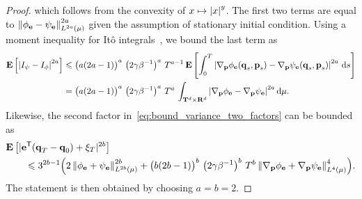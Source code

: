 \documentclass[11pt,a4paper]{article}
\newcommand{\expect}[0]{\mathbf{E}}
\newcommand{\real}{\mathbf R}
\newcommand{\torus}{\mathbf T}
\newcommand{\grad}{\nabla}
\newcommand{\vect}[1]{\boldsymbol{\mathbf #1}}
\renewcommand{\d}{\mathrm d}
\renewcommand{\t}{\mathsf T}
\theoremstyle{plain}
\numberwithin{equation}{section}
\renewcommand{\leq}{\leqslant}
\begin{document}
\begin{proof}
    which follows from the convexity of $x \mapsto \abs{x}^y$.
    The first two terms are equal to $\norm{\phi_{\vect e} - \psi_{\vect e}}_{L^{2 a}(\mu)}^{2 a}$
    given the assumption of stationary initial condition.
    Using a moment inequality for It\^o integrals~\cite[Theorem 7.1]{MR2380366},
    we bound the last term as
    \begin{align*}
        \expect \left[ \abs{I_{\psi} - I_{\phi}}^{2 a} \right]
        &\leq \bigl( a(2 a - 1)\bigr)^a \, \left(2 \gamma \beta^{-1}\right)^a \,  T^{a-1} \,
        \expect \left[ \int_{0}^{T} \abs{\grad_{\vect p} \phi_{\vect e}(\vect q_s, \vect p_s) - \grad_{\vect p} \psi_{\vect e}(\vect q_s, \vect p_s)}^{2a} \, \d s\right] \\
        &= \bigl(a(2a - 1)\bigr)^a \, \left(2 \gamma \beta^{-1}\right)^a \,  T^{a} \, \int_{\torus^d \times \real^d} \abs{\grad_{\vect p} \phi_{\vect e} - \grad_{\vect p} \psi_{\vect e}}^{2a} \d \mu.
    \end{align*}
    Likewise, the second factor in~\eqref{eq:bound_variance_two_factors} can be bounded as
    \begin{align*}
        &\expect \left[ |\vect e^\t(\vect q_T - \vect q_0) + \xi_T|^{2b} \right] \\
        &\qquad
        \leq 3^{2b-1} \Bigl( 2 \norm{\phi_{\vect e} + \psi_{\vect e}}[L^{2b}(\mu)]^{2b}
        + \bigl(b(2b - 1)\bigr)^b \, \left(2 \gamma \beta^{-1}\right)^b \, T^{b} \norm{\grad_{\vect p} \phi_{\vect e} + \grad_{\vect p} \psi_{\vect e}}[L^{4}(\mu)]^4 \Bigr).
    \end{align*}
    The statement is then obtained by choosing $a = b = 2$.
\end{proof}
\end{document}
